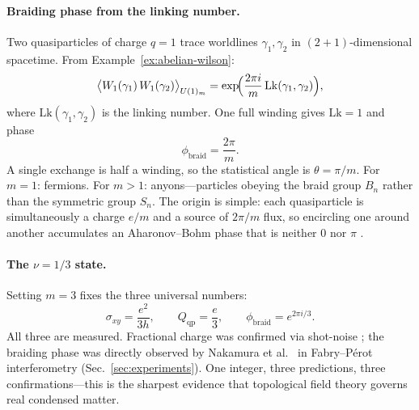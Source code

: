 \paragraph{Braiding phase from the linking number.}
Two quasiparticles of charge $q=1$ trace worldlines $\gamma_1,\gamma_2$ in $(2{+}1)$-dimensional spacetime. From Example~\ref{ex:abelian-wilson}:
\begin{equation}
  \bigl\langle W_1(\gamma_1)\,W_1(\gamma_2)\bigr\rangle_{U(1)_m}
  =
  \exp\!\Bigl(\frac{2\pi i}{m}\,\mathrm{Lk}(\gamma_1,\gamma_2)\Bigr),
  \label{eq:fqhe-linking-phase}
\end{equation}
where $\mathrm{Lk}(\gamma_1,\gamma_2)$ is the linking number. One full winding gives $\mathrm{Lk}=1$ and phase
\begin{equation}
  \phi_{\mathrm{braid}} = \frac{2\pi}{m}.
  \label{eq:fqhe-braiding-phase}
\end{equation}
A single exchange is half a winding, so the statistical angle is $\theta = \pi/m$. For $m=1$: fermions. For $m>1$: anyons---particles obeying the braid group $B_n$ rather than the symmetric group $S_n$. The origin is simple: each quasiparticle is simultaneously a charge $e/m$ and a source of $2\pi/m$ flux, so encircling one around another accumulates an Aharonov--Bohm phase that is neither $0$ nor $\pi$ \cite{Stern2008AnyonsQHEReview}.

\paragraph{The $\nu=1/3$ state.}
Setting $m=3$ fixes the three universal numbers:
\begin{equation}
  \sigma_{xy} = \frac{e^2}{3h},
  \qquad
  Q_{\mathrm{qp}} = \frac{e}{3},
  \qquad
  \phi_{\mathrm{braid}} = e^{2\pi i/3}.
  \label{eq:fqhe-one-third}
\end{equation}
All three are measured. Fractional charge was confirmed via shot-noise \cite{Saminadayar1997FractionalCharge,dePicciotto1997FractionalCharge}; the braiding phase was directly observed by Nakamura et al.\ \cite{Nakamura2020AnyonicBraiding} in Fabry--P\'{e}rot interferometry (Sec.~\ref{sec:experiments}). One integer, three predictions, three confirmations---this is the sharpest evidence that topological field theory governs real condensed matter.

